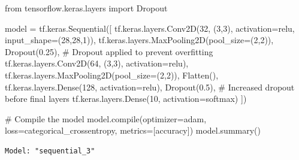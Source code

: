 \documentclass[
  letterpaper,
  DIV=11,
  numbers=noendperiod]{scrreprt}
\newenvironment{Shaded}{\begin{snugshade}}{\end{snugshade}}
\newcommand{\BuiltInTok}[1]{\textcolor[rgb]{0.00,0.23,0.31}{#1}}
\newcommand{\CommentTok}[1]{\textcolor[rgb]{0.37,0.37,0.37}{#1}}
\newcommand{\DecValTok}[1]{\textcolor[rgb]{0.68,0.00,0.00}{#1}}
\newcommand{\FloatTok}[1]{\textcolor[rgb]{0.68,0.00,0.00}{#1}}
\newcommand{\ImportTok}[1]{\textcolor[rgb]{0.00,0.46,0.62}{#1}}
\newcommand{\NormalTok}[1]{\textcolor[rgb]{0.00,0.23,0.31}{#1}}
\newcommand{\OperatorTok}[1]{\textcolor[rgb]{0.37,0.37,0.37}{#1}}
\newcommand{\StringTok}[1]{\textcolor[rgb]{0.13,0.47,0.30}{#1}}
\begin{document}
\begin{Shaded}
\begin{Highlighting}[]
\ImportTok{from}\NormalTok{ tensorflow.keras.layers }\ImportTok{import}\NormalTok{ Dropout}

\NormalTok{model }\OperatorTok{=}\NormalTok{ tf.keras.Sequential([}
\NormalTok{    tf.keras.layers.Conv2D(}\DecValTok{32}\NormalTok{, (}\DecValTok{3}\NormalTok{,}\DecValTok{3}\NormalTok{), activation}\OperatorTok{=}\StringTok{\textquotesingle{}relu\textquotesingle{}}\NormalTok{, input\_shape}\OperatorTok{=}\NormalTok{(}\DecValTok{28}\NormalTok{,}\DecValTok{28}\NormalTok{,}\DecValTok{1}\NormalTok{)),}
\NormalTok{    tf.keras.layers.MaxPooling2D(pool\_size}\OperatorTok{=}\NormalTok{(}\DecValTok{2}\NormalTok{,}\DecValTok{2}\NormalTok{)),}
\NormalTok{    Dropout(}\FloatTok{0.25}\NormalTok{),  }\CommentTok{\# Dropout applied to prevent overfitting}
\NormalTok{    tf.keras.layers.Conv2D(}\DecValTok{64}\NormalTok{, (}\DecValTok{3}\NormalTok{,}\DecValTok{3}\NormalTok{), activation}\OperatorTok{=}\StringTok{\textquotesingle{}relu\textquotesingle{}}\NormalTok{),}
\NormalTok{    tf.keras.layers.MaxPooling2D(pool\_size}\OperatorTok{=}\NormalTok{(}\DecValTok{2}\NormalTok{,}\DecValTok{2}\NormalTok{)),}
\NormalTok{    Flatten(),}
\NormalTok{    tf.keras.layers.Dense(}\DecValTok{128}\NormalTok{, activation}\OperatorTok{=}\StringTok{\textquotesingle{}relu\textquotesingle{}}\NormalTok{),}
\NormalTok{    Dropout(}\FloatTok{0.5}\NormalTok{),  }\CommentTok{\# Increased dropout before final layers}
\NormalTok{    tf.keras.layers.Dense(}\DecValTok{10}\NormalTok{, activation}\OperatorTok{=}\StringTok{\textquotesingle{}softmax\textquotesingle{}}\NormalTok{)}
\NormalTok{])}

\CommentTok{\# Compile the model}
\NormalTok{model.}\BuiltInTok{compile}\NormalTok{(optimizer}\OperatorTok{=}\StringTok{\textquotesingle{}adam\textquotesingle{}}\NormalTok{, loss}\OperatorTok{=}\StringTok{\textquotesingle{}categorical\_crossentropy\textquotesingle{}}\NormalTok{, metrics}\OperatorTok{=}\NormalTok{[}\StringTok{\textquotesingle{}accuracy\textquotesingle{}}\NormalTok{])}
\NormalTok{model.summary()}
\end{Highlighting}
\end{Shaded}

\begin{verbatim}
Model: "sequential_3"
\end{verbatim}
\end{document}
